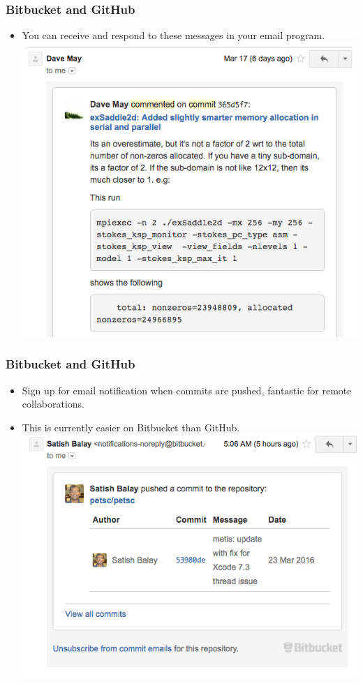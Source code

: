 \documentclass{beamer}
\begin{document}
\begin{frame}[fragile]
\frametitle{Bitbucket and GitHub}
\begin{itemize}
\item You can receive and respond to these messages in your email program.\\
\includegraphics[scale=0.3]{bitbucket5}
\end{itemize}
\end{frame}

\begin{frame}[fragile]
\frametitle{Bitbucket and GitHub}
\begin{itemize}
\item Sign up for email notification when commits are pushed, fantastic for remote collaborations. 
\item This is currently easier on Bitbucket than GitHub.\\
\includegraphics[scale=0.3]{bitbucket4}
\end{itemize}
\end{frame}
\end{document}
